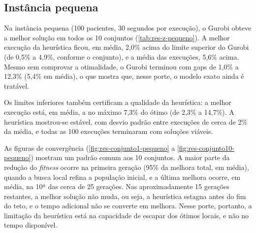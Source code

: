 \subsection{Instância pequena}
\label{sec:res-pequena}

Na instância pequena (100 pacientes, 30 segundos por execução), o Gurobi obteve a melhor solução em todos os 10 conjuntos (\autoref{tab:res-z-pequeno}). A melhor execução da heurística ficou, em média, 2,0\% acima do limite superior do Gurobi (de 0,5\% a 4,9\%, conforme o conjunto), e a média das execuções, 5,6\% acima. Mesmo sem comprovar a otimalidade, o Gurobi terminou com gaps de 1,0\% a 12,3\% (5,4\% em média), o que mostra que, nesse porte, o modelo exato ainda é tratável.

Os limites inferiores também certificam a qualidade da heurística: a melhor execução está, em média, a no máximo 7,3\% do ótimo (de 2,3\% a 14,7\%). A heurística mostrou-se estável, com desvio padrão entre execuções de cerca de 2\% da média, e todas as 100 execuções terminaram com soluções viáveis.

As figuras de convergência (\autoref{fig:res-conjunto1-pequeno} a \autoref{fig:res-conjunto10-pequeno}) mostram um padrão comum aos 10 conjuntos. A maior parte da redução do \textit{fitness} ocorre na primeira geração (95\% da melhora total, em média), quando a busca local refina a população inicial, e a última melhora ocorre, em média, na 10ª das cerca de 25 gerações. Nas aproximadamente 15 gerações restantes, a melhor solução não muda, ou seja, a heurística estagna antes do fim do teto, e o tempo adicional não se converte em melhora. Nesse porte, portanto, a limitação da heurística está na capacidade de escapar dos ótimos locais, e não no tempo disponível.

